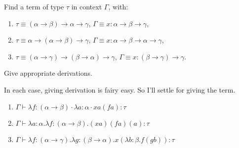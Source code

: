 \begin{problem}{2.13}
    Find a term of type $\tau$ in context $\Gamma$, with:
    \begin{enumerate}[label=$(\alph*)$]
    \item $\tau \equiv (\alpha \rightarrow \beta) \rightarrow \alpha \rightarrow \gamma$, $\Gamma \equiv x : \alpha \rightarrow \beta \rightarrow \gamma$,
    \item $\tau \equiv \alpha \rightarrow (\alpha \rightarrow \beta) \rightarrow \gamma$, $\Gamma \equiv x : \alpha \rightarrow \beta \rightarrow \alpha \rightarrow \gamma$,
    \item $\tau \equiv (\alpha \rightarrow \gamma) \rightarrow (\beta \rightarrow \alpha) \rightarrow \gamma$, $\Gamma \equiv x : (\beta \rightarrow \gamma) \rightarrow \gamma$.
    \end{enumerate}
    Give appropriate derivations.
\end{problem}

\begin{solution}
    In each case, giving derivation is fairy easy. So I'll settle for giving the term.
    \begin{enumerate}[label=$(\alph*)$]
        \item $ \Gamma \vdash \lambda f:(\alpha \to \beta) \cdot \lambda a:\alpha \cdot xa(fa) : \tau $
        \item $ \Gamma \vdash \lambda a:\alpha . \lambda f:(\alpha \to \beta).(xa)(fa)(a) : \tau $
        \item $ \Gamma \vdash \lambda f:(\alpha \to \gamma). \lambda g:(\beta \to \alpha) .x(\lambda b:\beta .f(gb)) : \tau $
    \end{enumerate}
\end{solution}